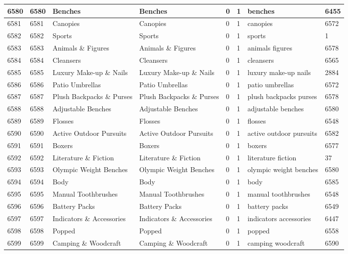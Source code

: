 \begin{longtable}{|l|l|l|l|l|l|l|l|}
6580 & 6580 & Benches & Benches & 0 & 1 & benches & 6455 \\ \hline 
6581 & 6581 & Canopies & Canopies & 0 & 1 & canopies & 6572 \\ \hline 
6582 & 6582 & Sports & Sports & 0 & 1 & sports & 1 \\ \hline 
6583 & 6583 & Animals \& Figures & Animals \& Figures & 0 & 1 & animals figures & 6578 \\ \hline 
6584 & 6584 & Cleansers & Cleansers & 0 & 1 & cleansers & 6565 \\ \hline 
6585 & 6585 & Luxury Make-up \& Nails & Luxury Make-up \& Nails & 0 & 1 & luxury make-up nails & 2884 \\ \hline 
6586 & 6586 & Patio Umbrellas & Patio Umbrellas & 0 & 1 & patio umbrellas & 6572 \\ \hline 
6587 & 6587 & Plush Backpacks \& Purses & Plush Backpacks \& Purses & 0 & 1 & plush backpacks purses & 6578 \\ \hline 
6588 & 6588 & Adjustable Benches & Adjustable Benches & 0 & 1 & adjustable benches & 6580 \\ \hline 
6589 & 6589 & Flosses & Flosses & 0 & 1 & flosses & 6548 \\ \hline 
6590 & 6590 & Active Outdoor Pursuits & Active Outdoor Pursuits & 0 & 1 & active outdoor pursuits & 6582 \\ \hline 
6591 & 6591 & Boxers & Boxers & 0 & 1 & boxers & 6577 \\ \hline 
6592 & 6592 & Literature \& Fiction & Literature \& Fiction & 0 & 1 & literature fiction & 37 \\ \hline 
6593 & 6593 & Olympic Weight Benches & Olympic Weight Benches & 0 & 1 & olympic weight benches & 6580 \\ \hline 
6594 & 6594 & Body & Body & 0 & 1 & body & 6585 \\ \hline 
6595 & 6595 & Manual Toothbrushes & Manual Toothbrushes & 0 & 1 & manual toothbrushes & 6548 \\ \hline 
6596 & 6596 & Battery Packs & Battery Packs & 0 & 1 & battery packs & 6549 \\ \hline 
6597 & 6597 & Indicators \& Accessories & Indicators \& Accessories & 0 & 1 & indicators accessories & 6447 \\ \hline 
6598 & 6598 & Popped & Popped & 0 & 1 & popped & 6558 \\ \hline 
6599 & 6599 & Camping \& Woodcraft & Camping \& Woodcraft & 0 & 1 & camping woodcraft & 6590 \\ \hline 

\end{longtable}
